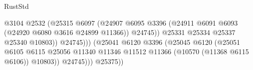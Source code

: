 \begin{lexlean}{RustStd}
\begin{coremodule}
                                                            @3104
                                                            @2532
                                                            (@25315
                                                              @6097
                                                              (@24907
                                                                @6095
                                                                @3396
                                                                (@24911
                                                                  @6091
                                                                  @6093
                                                                  (@24920
                                                                    @6080
                                                                    @3616
                                                                    @24899
                                                                    @11366))
                                                                @24745))
                                                            @25331
                                                            @25334
                                                            @25337
                                                            @25340
                                                            @10803))
                                                        @24745)))
                                                  (@25041
                                                    @6120
                                                    @3396
                                                    (@25045
                                                      @6120
                                                      (@25051
                                                        @6105
                                                        @6115
                                                        @25056
                                                        @11340
                                                        @11346
                                                        @11512
                                                        @11366
                                                        (@10570 (@11368 @6115 @6106))
                                                        @10803))
                                                    @24745)))
                                              @25375))

\end{coremodule}
\end{lexlean}
